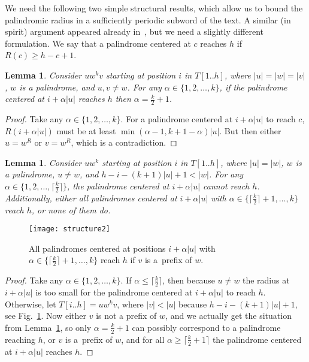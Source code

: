 \documentclass{article}[11pt,letter]
\newtheorem{lemma}[definition]{Lemma}
\newcommand{\head}{h}
\begin{document}
We need the following two simple structural results, which allow us to bound the palindromic radius in a sufficiently periodic subword of the
text. A similar (in spirit) argument appeared already in~\cite{Apostolico}, but we need a slightly different formulation. We say that a palindrome
centered at $c$ reaches $h$ if $R(c)\geq h-c+1$.

\begin{lemma}
\label{lemma:structure1}
Consider $uw^{k}v$ starting at position $i$ in $T[1..\head]$, where $|u|=|w|=|v|$, $w$ is a palindrome, and $u,v\neq w$.
For any $\alpha\in\{1,2,\ldots,k\}$, if the palindrome centered at $i+\alpha|u|$ reaches $h$ then $\alpha=\frac{k}{2}+1$.
\end{lemma}

\begin{proof}
Take any $\alpha\in\{1,2,\ldots,k\}$. For a palindrome centered at $i+\alpha|u|$ to reach $c$, $R(i+\alpha|u|)$ must be at least
$\min(\alpha-1,k+1-\alpha)|u|$. But then either $u=w^{R}$ or $v=w^{R}$, which is a contradiction.
\end{proof}

\begin{lemma}
\label{lemma:structure2}
Consider $uw^{k}$ starting at position $i$ in $T[1..\head]$, where $|u|=|w|$, $w$ is a palindrome, $u\neq w$, and $h-i-(k+1)|u|+1<|w|$.
For any $\alpha\in\{1,2,\ldots,\lceil\frac{k}{2}\rceil\}$, the palindrome centered at $i+\alpha |u|$ cannot reach $h$.
Additionally, either all palindromes centered at $i+\alpha |u|$ with $\alpha\in\{\lceil\frac{k}{2}\rceil+1,\ldots,k\}$ reach $h$, or none of them do.
\end{lemma}

\begin{figure}[t]
\texttt{[image: structure2]}
\caption{All palindromes centered at positions $i+\alpha|u|$ with $\alpha\in\{\lceil\frac{k}{2}\rceil+1,\ldots,k\}$ reach $h$ if $v$ is a~prefix of $w$.}
\label{fig:structure2}
\end{figure}

\begin{proof}
Take any $\alpha\in\{1,2,\ldots,k\}$. If $\alpha\leq\lceil\frac{k}{2}\rceil$, then because $u\neq w$ the radius at $i+\alpha |u|$ is too small
for the palindrome centered at $i+\alpha|u|$ to reach $h$.
Otherwise, let $T[i..\head]=uw^{k}v$, where $|v|<|u|$ because $h-i-(k+1)|u|+1$, see
Fig.~\ref{fig:structure2}. Now either $v$ is not a prefix
of $w$, and we actually get the situation from Lemma~\ref{lemma:structure1}, so only $\alpha=\frac{k}{2}+1$ can possibly correspond
to a palindrome reaching $h$, or $v$
is a~prefix of $w$, and for all $\alpha\geq\lceil\frac{k}{2}+1\rceil$ the palindrome centered at $i+\alpha|u|$ reaches $h$.
\end{proof}
\end{document}

